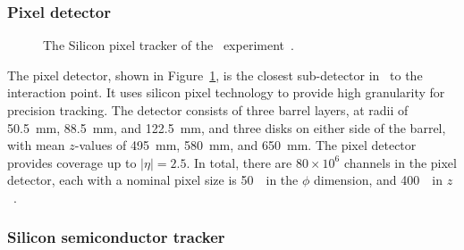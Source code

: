 \FloatBarrier
\subsubsection{Pixel detector} 
\label{sec:pixel}

\begin{figure}[ht]
  \caption{
    The Silicon pixel tracker of the \atlas\ experiment~\cite{Pequenao:1095925}.
  }
  \label{fig:pixel_cartoon}
\end{figure}


The pixel detector, shown in Figure~\ref{fig:pixel_cartoon}, is the closest
sub-detector in \atlas\ to the interaction point.
It uses silicon pixel technology to provide high granularity for precision
tracking.
The detector consists of three barrel layers, at radii of 50.5~mm, 88.5~mm,
and 122.5~mm, and three disks on either side of the barrel, with mean $z$-values
of 495~mm, 580~mm, and 650~mm.
The pixel detector provides coverage up to $|\eta| = 2.5$.
In total, there are $80 \times 10^{6}$ channels in the pixel detector, each 
with a nominal pixel size is 50~\um\ in the $\phi$ dimension, and 400~\um\ in
$z$~\cite{1748-0221-3-07-P07007}.

\FloatBarrier
\subsubsection{Silicon semiconductor tracker} 
\label{sec:sct}


